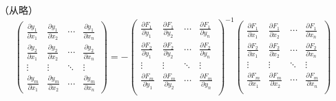\documentclass{ctexbook}
\begin{document}
\begin{theorem}[多函数多元向量值隐函数存在定理]
    （从略）
    \begin{equation}
        \begin{pmatrix}
            \frac{\partial y_1}{\partial x_1} & \frac{\partial y_1}{\partial x_2} & \cdots & \frac{\partial y_1}{\partial x_n} \\
            \frac{\partial y_2}{\partial x_1} & \frac{\partial y_2}{\partial x_2} & \cdots & \frac{\partial y_2}{\partial x_n} \\
            \vdots & \vdots & \ddots & \vdots \\
            \frac{\partial y_m}{\partial x_1} & \frac{\partial y_m}{\partial x_2} & \cdots & \frac{\partial y_m}{\partial x_n}
        \end{pmatrix}=
        -\begin{pmatrix}
            \frac{\partial F_1}{\partial y_1} & \frac{\partial F_1}{\partial y_2} & \cdots & \frac{\partial F_1}{\partial y_n} \\
            \frac{\partial F_2}{\partial y_1} & \frac{\partial F_2}{\partial y_2} & \cdots & \frac{\partial F_2}{\partial y_n} \\
            \vdots & \vdots & \ddots & \vdots \\
            \frac{\partial F_m}{\partial y_1} & \frac{\partial F_m}{\partial y_2} & \cdots & \frac{\partial F_m}{\partial y_n} \\
        \end{pmatrix}^{-1}
        \begin{pmatrix}
            \frac{\partial F_1}{\partial x_1} & \frac{\partial F_1}{\partial x_2} & \cdots & \frac{\partial F_1}{\partial x_n} \\
            \frac{\partial F_2}{\partial x_1} & \frac{\partial F_2}{\partial x_2} & \cdots & \frac{\partial F_2}{\partial x_n} \\
            \vdots & \vdots & \ddots & \vdots \\
            \frac{\partial F_m}{\partial x_1} & \frac{\partial F_m}{\partial x_2} & \cdots & \frac{\partial F_m}{\partial x_n} \\
        \end{pmatrix}
    \end{equation}
\end{theorem}
\end{document}
